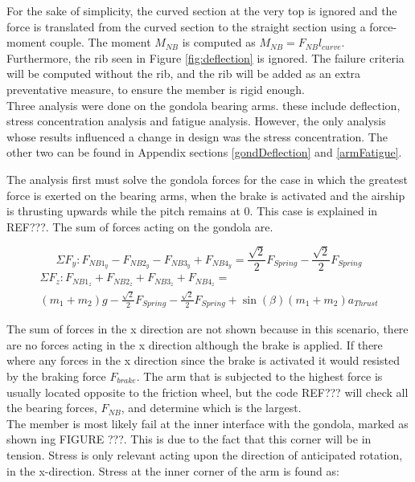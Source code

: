 \documentclass[../main.tex]{subfiles}
\begin{document}
For the sake of simplicity, the curved section at the very top is ignored and the force is translated from the curved section to the straight section using a force-moment couple. The moment $M_{NB}$ is computed as $M_{NB}=F_{NB}l_{curve}$. Furthermore, the rib seen in Figure \ref{fig:deflection} is ignored. The failure criteria will be computed without the rib, and the rib will be added as an extra preventative measure, to ensure the member is rigid enough.\\

Three analysis were done on the gondola bearing arms. these include deflection, stress concentration analysis and fatigue analysis. However, the only analysis whose results influenced a change in design was the stress concentration. The other two can be found in Appendix sections \ref{gondDeflection} and \ref{armFatigue}.

The analysis first must solve the gondola forces for the case in which the greatest force is exerted on the bearing arms, when the brake is activated and the airship is thrusting upwards while the pitch remains at 0. This case is explained in REF???. The sum of forces acting on the gondola are. 

\begin{equation} \label{FygondLA}
\Sigma F_{y} : F_{NB1_{y}} - F_{NB2_{y}} - F_{NB3_{y}} + F_{NB4_{y}} = \frac{\sqrt{2}}{2} F_{Spring} -\frac{\sqrt{2}}{2} F_{Spring} 
\end{equation}
\begin{multline} \label{FzgondLA}
\Sigma F_{z} : F_{NB1_{z}} + F_{NB2_{z}} + F_{NB3_{z}} + F_{NB4_{z}} =\\ (m_{1} + m_2)g - \frac{\sqrt{2}}{2} F_{Spring} - \frac{\sqrt{2}}{2} F_{Spring} + \sin(\beta) (m_1+m_2) a_{Thrust}
\end{multline}
 

The sum of forces in the x direction are not shown because in this scenario, there are no forces acting in the x direction although the brake is applied. If there where any forces in the x direction since the brake is activated it would resisted by the braking force $F_{brake}$. The arm that is subjected to the highest force is usually located opposite to the friction wheel, but the code REF??? will check all the bearing forces, $F_{NB}$, and determine which is the largest. \\

The member is most likely fail at the inner interface with the gondola, marked as shown ing FIGURE ???. This is due to the fact that this corner will be in tension. Stress is only relevant acting upon the direction of anticipated rotation, in the x-direction. Stress at the inner corner of the arm is found as:
\end{document}
